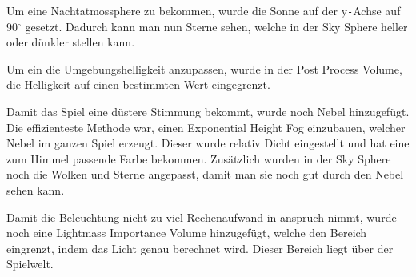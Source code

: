 Um eine Nachtatmossphere zu bekommen, wurde die Sonne auf der y\verb+-+Achse auf 90$^\circ$ gesetzt. Dadurch kann man nun Sterne sehen,
welche in der Sky Sphere heller oder dünkler stellen kann.

Um ein die Umgebungshelligkeit anzupassen, wurde in der Post Process Volume, die Helligkeit auf einen bestimmten Wert eingegrenzt.

Damit das Spiel eine düstere Stimmung bekommt, wurde noch Nebel hinzugefügt. Die effizienteste Methode war, einen Exponential Height Fog einzubauen, welcher
Nebel im ganzen Spiel erzeugt. Dieser wurde relativ Dicht eingestellt und hat eine zum Himmel passende Farbe bekommen. Zusätzlich wurden in der Sky Sphere noch die Wolken
und Sterne angepasst, damit man sie noch gut durch den Nebel sehen kann.

Damit die Beleuchtung nicht zu viel Rechenaufwand in anspruch nimmt, wurde noch eine Lightmass Importance Volume hinzugefügt, welche den Bereich eingrenzt,
indem das Licht genau berechnet wird. Dieser Bereich liegt über der Spielwelt.